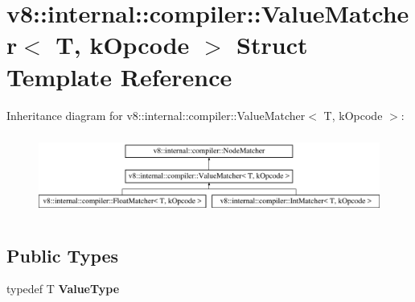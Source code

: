 \hypertarget{structv8_1_1internal_1_1compiler_1_1ValueMatcher}{}\section{v8\+:\+:internal\+:\+:compiler\+:\+:Value\+Matcher$<$ T, k\+Opcode $>$ Struct Template Reference}
\label{structv8_1_1internal_1_1compiler_1_1ValueMatcher}
Inheritance diagram for v8\+:\+:internal\+:\+:compiler\+:\+:Value\+Matcher$<$ T, k\+Opcode $>$\+:\begin{figure}[H]
\begin{center}
\leavevmode
\includegraphics[height=2.683706cm]{structv8_1_1internal_1_1compiler_1_1ValueMatcher}
\end{center}
\end{figure}
\subsection*{Public Types}
\begin{DoxyCompactItemize}
\item 
\mbox{\label{structv8_1_1internal_1_1compiler_1_1ValueMatcher_aa77e418e584a0979aacdce651384a896}} 
typedef T {\bfseries Value\+Type}
\end{DoxyCompactItemize}
